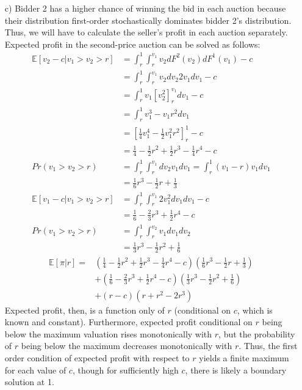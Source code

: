 \documentclass{article}
\newcommand{\E}[1]{\mathbb{E}\left[#1\right]} %
\begin{document}
\begin{itemize}
	\pagebreak
	\item[c)] Bidder 2 has a higher chance of winning the bid in each auction because their distribution first-order stochastically dominates bidder 2's distribution. Thus, we will have to calculate the seller's profit in each auction separately. Expected profit in the second-price auction can be solved as follows:
	{\small \begin{align*}
		\E{v_2-c|v_1>v_2>r} &= \int_r^1\int_r^{v_1}v_2dF^2(v_2)dF^1(v_1)-c							\\
							&= \int_r^1\int_r^{v_1}v_2dv_2 2v_1 dv_1-c								\\
							&= \int_r^1v_1[v_2^2]_r^{v_1} dv_1-c									\\
							&= \int_r^1v_1^3 - v_1r^2dv_1											\\
							&= \left[\frac{1}{4}v_1^4- \frac{1}{2}v_1^2r^2\right]_r^1-c				\\
							&= \frac{1}{4} -\frac{1}{2}r^2 + \frac{1}{2}r^3 - \frac{1}{4}r^4 - c	\\
			Pr(v_1>v_2>r)	&= \int_r^1\int_r^{v_1} dv_2v_1dv_1 = \int_r^1(v_1-r)v_1dv_1			\\
							&= \frac{1}{6}r^3 - \frac{1}{2}r + \frac{1}{3}							\\
		\E{v_1-c|v_1>v_2>r} &=  \int_r^1\int_r^{v_1}2v_1^2dv_1dv_1-c								\\	
							&= \frac{1}{6}-\frac{2}{3}r^3+\frac{1}{2}r^4-c							\\
			Pr(v_1>v_2>r)	&= \int_r^1\int_r^{v_2}v_1dv_1 dv_2 									\\
							&= \frac{1}{3}r^3 - \frac{1}{2}r^2 + \frac{1}{6}						
	\end{align*} }
	{\small \begin{align*}
		\E{\pi|r} = &\left(\frac{1}{4} -\frac{1}{2}r^2 + \frac{1}{2}r^3 - \frac{1}{4}r^4 - c\right)
					\left(\frac{1}{6}r^3 - \frac{1}{2}r + \frac{1}{3}\right)		\\
					&+ \left(\frac{1}{6}-\frac{2}{3}r^3+\frac{1}{2}r^4-c\right)
					\left(\frac{1}{3}r^3 - \frac{1}{2}r^2 + \frac{1}{6}\right)	\\
					&+ (r-c)\left(r+r^2-2r^3\right)
	\end{align*} }
	Expected profit, then, is a function only of $r$ (conditional on $c$, which is known and constant). Furthermore, expected profit conditional on $r$ being below the maximum valuation rises monotonically with $r$, but the probability of $r$ being below the maximum decreases monotonically with $r$. Thus, the first order condition of expected profit with respect to $r$ yields a finite maximum for each value of $c$, though for sufficiently high $c$, there is likely a boundary solution at 1. \\

\end{itemize}
\end{document}
